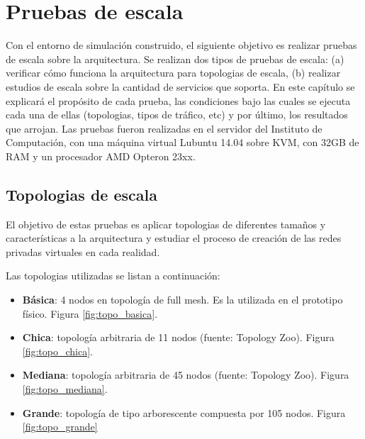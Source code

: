 \chapter{Pruebas de escala}

\graphicspath{{Chapter4/Figs/}}

Con el entorno de simulación construido, el siguiente objetivo es realizar pruebas de escala sobre la arquitectura. Se realizan dos tipos de pruebas de escala: (a) verificar cómo funciona la arquitectura para topologias de escala, (b) realizar estudios de escala sobre la cantidad de servicios que soporta. En este capítulo se explicará el propósito de cada prueba, las condiciones bajo las cuales se ejecuta cada una de ellas (topologias, tipos de tráfico, etc) y por último, los resultados que arrojan. Las pruebas fueron realizadas en el servidor del Instituto de Computación, con una máquina virtual Lubuntu 14.04 sobre KVM, con 32GB de RAM y un procesador AMD Opteron 23xx.

\section{Topologias de escala}
El objetivo de estas pruebas es aplicar topologias de diferentes tamaños y características a la arquitectura y estudiar el proceso de creación de las redes privadas virtuales en cada realidad.

Las topologias utilizadas se listan a continuación:
\begin{itemize}
	\item \textbf{Básica}: 4 nodos en topología de full mesh. Es la utilizada en el prototipo físico. Figura \ref{fig:topo_basica}.
	\item \textbf{Chica}: topología arbitraria de 11 nodos (fuente: Topology Zoo). Figura \ref{fig:topo_chica}.
	\item \textbf{Mediana}: topología arbitraria de 45 nodos (fuente: Topology Zoo). Figura \ref{fig:topo_mediana}.
	\item \textbf{Grande}: topología de tipo arborescente compuesta por 105 nodos. Figura \ref{fig:topo_grande}
\end{itemize}

